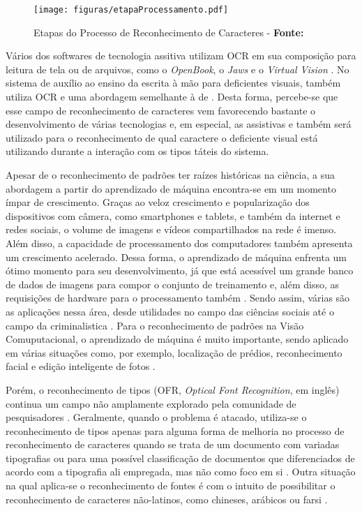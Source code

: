 \begin{figure}[H]
  \centering
  \texttt{[image: figuras/etapaProcessamento.pdf]}
  \caption{Etapas do Processo de Reconhecimento de Caracteres - \textbf{Fonte:} }
  \label{fig:etapas}
\end{figure}

Vários dos softwares de tecnologia assitiva utilizam OCR em sua composição para leitura de tela ou de arquivos, como o \textit{OpenBook}, o \textit{Jaws} e o \textit{Virtual Vision}   . No sistema de auxílio ao ensino da escrita à mão para deficientes visuais,  também utiliza OCR e uma abordagem semelhante à de . Desta forma, percebe-se que esse campo de reconhecimento de caracteres vem favorecendo bastante o desenvolvimento de várias tecnologias e, em especial, as assistivas e também será utilizado para o reconhecimento de qual caractere o deficiente visual está utilizando durante a interação com os tipos táteis do sistema.

Apesar de o reconhecimento de padrões ter raízes históricas na ciência, a sua abordagem a partir do aprendizado de máquina encontra-se em um momento ímpar de crescimento. Graças ao veloz crescimento e popularização dos dispositivos com câmera, como smartphones e tablets, e também da internet e redes sociais, o volume de imagens e vídeos compartilhados na rede é imenso. Além disso, a capacidade de processamento dos computadores também apresenta um crescimento acelerado. Dessa forma, o aprendizado de máquina enfrenta um ótimo momento  para seu desenvolvimento, já que está acessível um grande banco de dados de imagens para compor o conjunto de treinamento e, além disso, as requisições de hardware para o processamento também . Sendo assim, várias são as aplicações nessa área, desde utilidades no campo das ciências sociais até o campo da criminalistica  . Para o reconhecimento de padrões na Visão Comuputacional, o aprendizado de máquina é muito importante, sendo aplicado em várias situações como, por exemplo, localização de prédios, reconhecimento facial e edição inteligente de fotos .

Porém, o reconhecimento de tipos (OFR, \textit{Optical Font Recognition}, em inglês) continua um campo não amplamente explorado pela comunidade de pesquisadores . Geralmente, quando o problema é atacado, utiliza-se o reconhecimento de tipos apenas para alguma forma de melhoria no processo de reconhecimento de caracteres quando se trata de um documento com variadas tipografias ou para uma possível classificação de documentos que diferenciados de acordo com a tipografia ali empregada, mas não como foco em si  . Outra situação na qual aplica-se o reconhecimento de fontes é com o intuito de possibilitar o reconhecimento de caracteres não-latinos, como chineses, arábicos ou farsi   .

